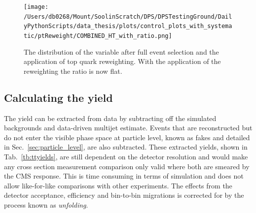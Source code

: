\begin{figure}[hp]
	\centering	\texttt{[image: /Users/db0268/Mount/SoolinScratch/DPS/DPSTestingGround/DailyPythonScripts/data\_thesis/plots/control\_plots\_with\_systematic/ptReweight/COMBINED\_HT\_with\_ratio.png]}
	\caption[The distribution of the \HT{} variable after full event selection and the application of top quark \pt{} reweighting. With the application of the reweighting the ratio is now flat.]{The distribution of the \HT{} variable after full event selection and the application of top quark \pt{} reweighting. With the application of the reweighting the ratio is now flat.}
	\label{fig:combPtReweight}
\end{figure}

\subsection{Calculating the \ttbar{} yield} %
\label{sub:calculating_the_yield}

The \ttbar{} yield can be extracted from data by subtracting off the simulated backgrounds and data-driven multijet \QCD estimate.
Events that are reconstructed but do not enter the visible phase space at particle level, known as fakes and detailed in Sec.~\ref{sec:particle_level}, are also subtracted.
These extracted yields, shown in Tab.~\ref{tb:ttyields}, are still dependent on the detector resolution and would make any cross section measurement comparison only valid where both are smeared by the CMS response.
This is time consuming in terms of simulation and does not allow like-for-like comparisons with other experiments.
The effects from the detector acceptance, efficiency and bin-to-bin migrations is corrected for by the process known as \textit{unfolding}.





